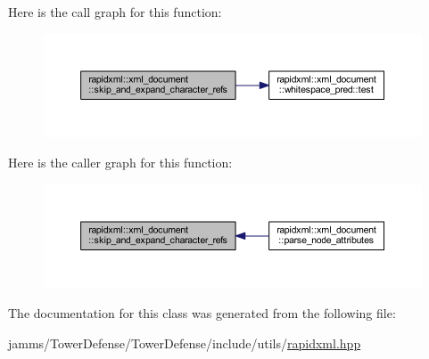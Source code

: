 Here is the call graph for this function\+:\nopagebreak
\begin{figure}[H]
\begin{center}
\leavevmode
\includegraphics[width=350pt]{singletonrapidxml_1_1xml__document_af86781975cdfff2105fa8c0b49ab4507_cgraph}
\end{center}
\end{figure}




Here is the caller graph for this function\+:\nopagebreak
\begin{figure}[H]
\begin{center}
\leavevmode
\includegraphics[width=350pt]{singletonrapidxml_1_1xml__document_af86781975cdfff2105fa8c0b49ab4507_icgraph}
\end{center}
\end{figure}




The documentation for this class was generated from the following file\+:\begin{DoxyCompactItemize}
\item 
jamms/\+Tower\+Defense/\+Tower\+Defense/include/utils/\hyperlink{rapidxml_8hpp}{rapidxml.\+hpp}\end{DoxyCompactItemize}
